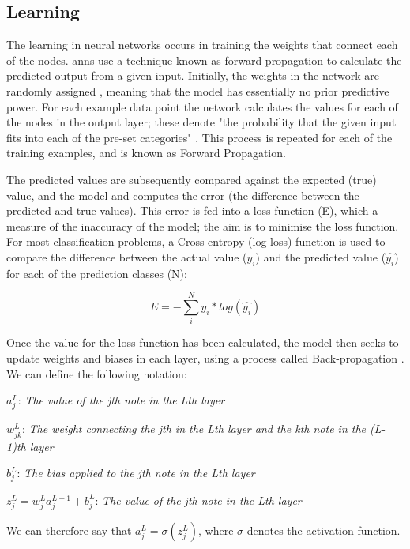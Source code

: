 \subsection{Learning}
\label{sec:background_anns_learning}

The learning in neural networks occurs in training the weights that connect each of the nodes. \acrlong{ann}s use a technique known as forward propagation to calculate the predicted output from a given input. Initially, the weights in the network are randomly assigned \citep{Bishop}, meaning that the model has essentially no prior predictive power. For each example data point the network calculates the values for each of the nodes in the output layer; these denote "the probability that the given input fits into each of the pre-set categories" \citep{Yathish}. This process is repeated for each of the training examples, and is known as Forward Propagation. 

The predicted values are subsequently compared against the expected (true) value, and the model and computes the error (the difference between the predicted and true values). This error is fed into a loss function (E), which a measure of the inaccuracy of the model; the aim is to minimise the loss function. For most classification problems, a Cross-entropy (log loss) function is used to compare the difference between the actual value ($y_i$) and the predicted value ($\hat{y_i}$) for each of the prediction classes (N):

$$E = -\sum_i^N y_i*log(\hat{y_i})$$

Once the value for the loss function has been calculated, the model then seeks to update weights and biases in each layer, using a process called Back-propagation \citep{Rumelhart}. We can define the following notation:

$a_j^L$: \textit{The value of the jth note in the Lth layer}

$w_{jk}^L$: \textit{The weight connecting the jth in the Lth layer and the kth note in the (L-1)th layer}

$b_j^L$: \textit{The bias applied to the jth note in the Lth layer}

$z_j^L = w_j^L a_j^{L-1} + b_j^L$: \textit{The value of the jth note in the Lth layer}

We can therefore say that $a_j^L = \sigma(z_j^L)$, where $\sigma$ denotes the activation function.

